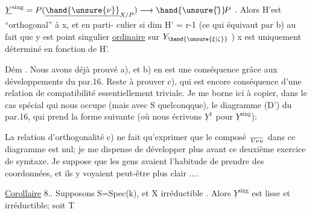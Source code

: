 
$\underline{Y}^{\mathrm{sing}} = P(\underline{\hand{\unsure{\nu}}}_{X/P}) \longrightarrow \hand{\unsure{\check{}}}\!P$ . Alors H'est ``orthogonal'' à x, et en parti-%
culier si dim H' = r-1 (ce qui équivaut par b) au fait que  
y est point  singulier \uline{ordinaire} sur $Y_{\hand{\unsure{\xi|\zeta}}}$ ) x est uniquement déterminé
en fonction de H'.

Dém . Nous avons déjà prouvé a), et b) en est une conséquence
grâce aux développements du par.16. Reste à prouver c), qui est
encore conséquence d'une relation de compatibilité essentiellement
triviale. Je me borne ici à copier, dans le cas spécial qui nous
occupe (mais avec S quelconqque), le diagramme (D') du par.16, qui
prend la forme suivante (où nous écrivons $\underline{Y}^1$ pour $\underline{Y}^{\mathrm{sing}}$):


La relation d'orthogonalité c) ne fait qu'exprimer que le composé
$\over{V}{\nu}u$ dans ce diagramme est nul; je me dispense de développer plus
avant ce deuxième exercice de symtaxe. Je suppose que les gens avaient
l'habitude de prendre des coordonnées, et ils y voyaient peut-être plus
clair ....

\uline{Corollaire} 8.. Supposons S=Spec(k),   et X
irréductible .  Alors $\underline{Y}^{\mathrm{sing}}$ est lisse et irréductible; soit T


